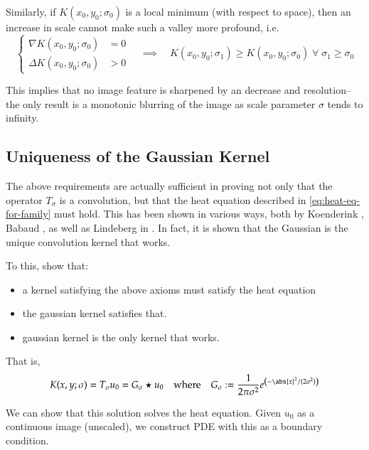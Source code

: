     Similarly, if $K(x_0,y_0;\sigma_0)$ is a local minimum (with respect to space), then an increase in scale cannot make such a valley more profound, i.e.
   \begin{equation}
   \left\{\begin{aligned}
   \nabla K(x_0,y_0; \sigma_0) &= 0 \\
	\Delta K(x_0,y_0;\sigma_0) &> 0
	\end{aligned}\right.
	\quad \implies \quad
	K(x_0,y_0;\sigma_1) \ge K(x_0,y_0;\sigma_0)
	\; \forall\; \sigma_1 \ge \sigma_0
	\end{equation}
    
    This implies that no image feature is sharpened by an decrease and resolution--the only result is a monotonic blurring of the image as scale parameter $\sigma$ tends to infinity.


    \subsection{Uniqueness of the Gaussian Kernel}
    
    The above requirements are actually sufficient in proving not only that the operator $T_\sigma$ is a convolution, but that the heat equation described in \cref{eq:heat-eq-for-family} must hold. This has been shown in various ways, both by Koenderink \cite{Koenderink}, Babaud \cite{babaud}, as well as Lindeberg in \cite{GSST-book}. In fact, it is shown that the Gaussian is the unique convolution kernel that works.    
    
   To this, show that:
    \begin{itemize}
    \item a kernel satisfying the above axioms must satisfy the heat equation
  	\item the gaussian kernel satisfies that.
    \item gaussian kernel is the only kernel that works.
    \end{itemize}
    
    That is,
    \begin{equation}
   K(x,y;\sigma) = T_{\sigma} u_0 = G_\sigma \star u_0
   	\quad \textrm{where}\quad
   	G_\sigma := \frac{1}{2\pi \sigma^2} e^{\left(-\abs{x}^2 / (2\sigma^2)\right)}
    \end{equation}
    
	We can show that this solution solves the heat equation.
	Given $u_0$ as a continuous image (unscaled),
	we construct PDE with this as a boundary condition.
    
